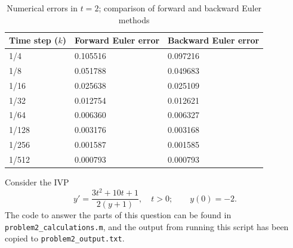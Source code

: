 \documentclass{homework}
\begin{document}
\begin{arabicparts}
		\begin{table}[htb]
			\centering
			\begin{tabular}{@{}lll@{}}
				\toprule
				Time step ($k$) & Forward Euler error & Backward Euler error \\
				\midrule
				1/4 & 0.105516 & 0.097216 \\
				1/8 & 0.051788 & 0.049683 \\
				1/16 & 0.025638 & 0.025109 \\
				1/32 & 0.012754 & 0.012621 \\
				1/64 & 0.006360 & 0.006327 \\
				1/128 & 0.003176 & 0.003168 \\
				1/256 & 0.001587 & 0.001585 \\
				1/512 & 0.000793 & 0.000793 \\
				\bottomrule
			\end{tabular}
			\caption{Numerical errors in $t=2$; comparison of forward and backward Euler methods}
			\label{table:p1}
		\end{table}
	\end{arabicparts}
	
	\question
	
	Consider the IVP
	\begin{equation}
		y' = \frac{3t^2+10t+1}{2(y+1)}, \quad t > 0; \qquad y(0) = -2.
	\end{equation}
	The code to answer the parts of this question can be found in \lstinline{problem2_calculations.m}, and the output from running this script has been copied to \lstinline{problem2_output.txt}.
	
\end{document}
